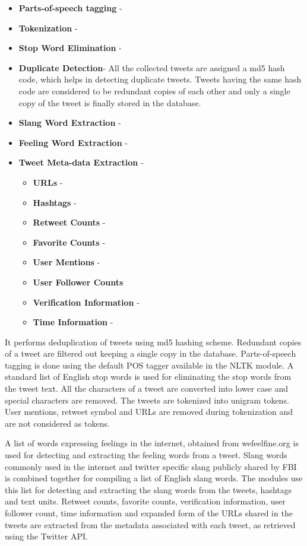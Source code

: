 \begin{itemize}
\item \textbf{Parts-of-speech tagging} - 
\item \textbf{Tokenization} - 
\item \textbf{Stop Word Elimination} - 
\item \textbf{Duplicate Detection}- All the collected tweets are assigned a md5 hash code, which helps in detecting duplicate tweets. Tweets having the same hash code are considered to be redundant copies of each other and only a single copy of the tweet is finally stored in the database.
\item \textbf{Slang Word Extraction} -
\item \textbf{Feeling Word Extraction} - 
\item \textbf{Tweet Meta-data Extraction} - 
\begin{itemize}
\item \textbf{URLs} - 
\item \textbf{Hashtags} - 
\item \textbf{Retweet Counts} - 
\item \textbf{Favorite Counts} - 
\item \textbf{User Mentions} - 
\item \textbf{User Follower Counts}
\item \textbf{Verification Information} - 
\item \textbf{Time Information} - 
\end{itemize}
\end{itemize}


It performs deduplication of tweets using md5 hashing scheme. Redundant copies of a tweet are filtered out keeping a single copy in the database. Parts-of-speech tagging is done using the default POS tagger available in the NLTK  module. A standard list of English stop words is used for eliminating the stop words from the tweet text. All the characters of a tweet are converted into lower case and special characters are removed. The tweets are tokenized into unigram tokens. User mentions, retweet symbol and URLs are removed during tokenization and are not considered as tokens.

A list of words expressing feelings in the internet, obtained from wefeelfine.org is used for detecting and extracting the feeling words from a tweet. Slang words commonly used in the internet and twitter specific slang publicly shared by FBI  is combined together for compiling a list of English slang words. The modules use this list for detecting and extracting the slang words from the tweets, hashtags and text units. Retweet counts, favorite counts, verification information, user follower count, time information and expanded form of the URLs shared in the tweets are extracted from the metadata associated with each tweet, as retrieved using the Twitter API. 


